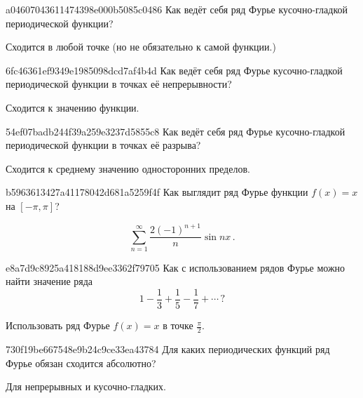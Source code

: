 \begin{note}{a04607043611474398e000b5085c0486}
    Как ведёт себя ряд Фурье кусочно-гладкой периодической функции?

    \begin{cloze}{1}
        Сходится в любой точке (но не обязательно к самой функции.)
    \end{cloze}
\end{note}

\begin{note}{6fc46361ef9349e1985098dcd7af4b4d}
    Как ведёт себя ряд Фурье кусочно-гладкой периодической функции в точках её непрерывности?

    \begin{cloze}{1}
        Сходится к значению функции.
    \end{cloze}
\end{note}

\begin{note}{54ef07badb244f39a259e3237d5855c8}
    Как ведёт себя ряд Фурье кусочно-гладкой периодической функции в точках её разрыва?

    \begin{cloze}{1}
        Сходится к среднему значению односторонних пределов.
    \end{cloze}
\end{note}

\begin{note}{b5963613427a41178042d681a5259f4f}
    Как выглядит ряд Фурье функции \({ f(x) = x }\) на \({ [-\pi, \pi] }\)?

    \begin{cloze}{1}
        \[
            \sum_{n=1}^{\infty} \frac{2(-1)^{n+1}}{n} \sin nx\,.
        \]
    \end{cloze}
\end{note}

\begin{note}{e8a7d9c8925a418188d9ee3362f79705}
    Как с использованием рядов Фурье можно найти значение ряда
    \[
        1 - \frac{1}{3} + \frac{1}{5} - \frac{1}{7} + \cdots\,?
    \]

    \begin{cloze}{1}
        Использовать ряд Фурье \({ f(x) = x }\) в точке \({ \frac{\pi}{2} }\).
    \end{cloze}
\end{note}

\begin{note}{730f19be667548e9b24c9ce33ea43784}
    Для каких периодических функций ряд Фурье обязан сходится абсолютно?

    \begin{cloze}{1}
        Для непрерывных и кусочно-гладких.
    \end{cloze}
\end{note}

